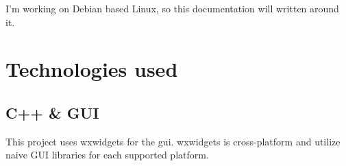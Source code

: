 
I’m working on Debian based Linux, so this documentation will written around it.

\section{Technologies used}

\subsection{C++ \& GUI}
This project uses \gls{wxwidgets} for the \gls{gui}.  \gls{wxwidgets} is cross-platform and utilize naive GUI libraries for each supported platform.
